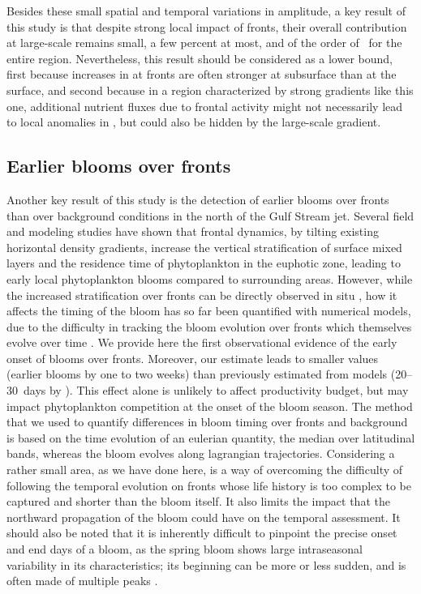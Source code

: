 Besides these small spatial and temporal variations in amplitude, a key result of this study is that despite strong local impact of fronts, their overall contribution at large-scale remains small, a few percent at most, and of the order of~ for the entire region.
Nevertheless, this result should be considered as a lower bound, first because increases in  at fronts are often stronger at subsurface than at the surface, and second because in a region characterized by strong gradients like this one, additional nutrient fluxes due to frontal activity might not necessarily lead to local anomalies in , but could also be hidden by the large-scale gradient.


\subsection{Earlier blooms over fronts}

Another key result of this study is the detection of earlier blooms over fronts than over background conditions in the north of the Gulf Stream jet.
Several field and modeling studies have shown that frontal dynamics, by tilting existing horizontal density gradients, increase the vertical stratification of surface mixed layers \parencite{taylor_2011} and the residence time of phytoplankton in the euphotic zone, leading to early local phytoplankton blooms compared to surrounding areas.
However, while the increased stratification over fronts can be directly observed in situ \parencite{karleskind_2011, mahadevan_2012}, how it affects the timing of the bloom has so far been quantified with numerical models, due to the difficulty in tracking the bloom evolution over fronts which themselves evolve over time \parencite{levy_2000, karleskind_2011, mahadevan_2012}.
We provide here the first observational evidence of the early onset of blooms over fronts.
Moreover, our estimate leads to smaller values (earlier blooms by one to two weeks) than previously estimated from models (20--30~days by \textcite{mahadevan_2012}).
This effect alone is unlikely to affect productivity budget, but may impact phytoplankton competition at the onset of the bloom season.
The method that we used to quantify differences in bloom timing over fronts and background is based on the time evolution of an eulerian quantity, the  median over latitudinal bands, whereas the bloom evolves along lagrangian trajectories.
Considering a rather small area, as we have done here, is a way of overcoming the difficulty of following the temporal evolution on fronts whose life history is too complex to be captured and shorter than the bloom itself.
It also limits the impact that the northward propagation of the bloom could have on the temporal assessment.
It should also be noted that it is inherently difficult to pinpoint the precise onset and end days of a bloom, as the spring bloom shows large intraseasonal variability in its characteristics; its beginning can be more or less sudden, and is often made of multiple peaks \parencite{keerthi_2020}.



